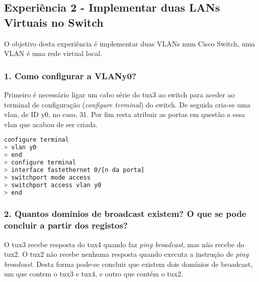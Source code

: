 \subsection*{Experiência 2 - Implementar duas LANs Virtuais no Switch}
O objetivo desta experiência é implementar duas VLANs num Cisco Switch, uma VLAN é uma rede virtual local.

\subsubsection{1. Como configurar a VLANy0?}
Primeiro é necessário ligar um cabo série do tux3 ao switch para aceder ao terminal de configuração (\emph{configure terminal}) do switch. De seguida cria-se uma vlan, de ID y0, no caso, 31. Por fim resta atribuir as portas em questão a essa vlan que acabou de ser criada.
\begin{lstlisting}[language=bash]
configure terminal
> vlan y0
> end
> configure terminal
> interface fastethernet 0/[n da porta]
> switchport mode access
> switchport access vlan y0
> end

\end{lstlisting}

\subsubsection{2. Quantos domínios de broadcast existem? O que se pode concluir a partir dos registos?}
O tux3 recebe resposta do tux4 quando faz \emph{ping broadcast}, mas não recebe do tux2. O tux2 não recebe nenhuma resposta quando executa a instrução de \emph{ping broadcast}. Desta forma pode-se concluir que existem dois domínios de broadcast, um que contem o tux3 e tux4, e outro que contém o tux2.
